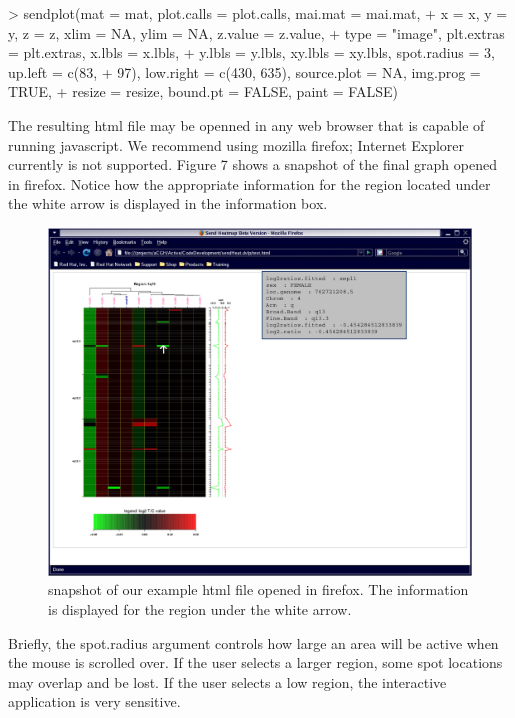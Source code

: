 \documentclass[]{article}
\begin{document}
\begin{Schunk}
\begin{Sinput}
> sendplot(mat = mat, plot.calls = plot.calls, mai.mat = mai.mat, 
+     x = x, y = y, z = z, xlim = NA, ylim = NA, z.value = z.value, 
+     type = "image", plt.extras = plt.extras, x.lbls = x.lbls, 
+     y.lbls = y.lbls, xy.lbls = xy.lbls, spot.radius = 3, up.left = c(83, 
+         97), low.right = c(430, 635), source.plot = NA, img.prog = TRUE, 
+     resize = resize, bound.pt = FALSE, paint = FALSE)
\end{Sinput}
\end{Schunk}
\quad The resulting html file may be openned in any web browser that is capable of running javascript. We recommend using mozilla firefox; Internet Explorer currently is not supported. Figure 7 shows a snapshot of the final graph opened in firefox. Notice how the appropriate information for the region located under the white arrow is displayed in the information box.

\begin{center}
\begin{figure}
\includegraphics{sendPlot4}
\caption{snapshot of our example html file opened in firefox. The information is displayed for the region under the white arrow.}
\end{figure}
\end{center}

\quad  Briefly, the spot.radius argument controls how large an area will be active when the mouse is scrolled over. If the user selects a larger region, some spot locations may overlap and be lost. If the user selects a low region, the interactive application is very sensitive. 
\end{document}

